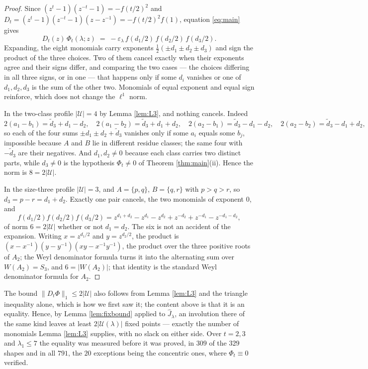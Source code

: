 \documentclass[11pt,reqno]{amsart}
\newcommand{\stverif}{\textcolor{hverif}{\small verified}}
\theoremstyle{plain}
\theoremstyle{definition}
\begin{document}
\begin{proof}
Since $(z^t-1)(z^{-t}-1)=-f(t/2)^2$ and $D_t=(z^t-1)(z^{-t}-1)(z-z^{-1})=-f(t/2)^2f(1)$, equation
\eqref{eq:main} gives
\[
D_t(z)\,\Phi_t(\lambda;z)\;=\;-\varepsilon_\lambda\,f(d_1/2)\,f(d_2/2)\,f(d_3/2).
\]
Expanding, the eight monomials carry exponents $\tfrac12(\pm d_1\pm d_2\pm d_3)$ and sign the
product of the three choices. Two of them cancel exactly when their exponents agree and their signs
differ, and comparing the two cases --- the choices differing in all three signs, or in one --- that
happens only if some $d_i$ vanishes or one of $d_1,d_2,d_3$ is the sum of the other two. Monomials of
equal exponent and equal sign reinforce, which does not change the $\ell^1$ norm.

In the two-class profile $|\mathcal U|=4$ by Lemma \ref{lem:L3}, and nothing cancels. Indeed
\[
2(a_1-b_1)=\tilde d_3+d_1-d_2,\quad
2(a_1-b_2)=\tilde d_3+d_1+d_2,\quad
2(a_2-b_1)=\tilde d_3-d_1-d_2,\quad
2(a_2-b_2)=\tilde d_3-d_1+d_2,
\]
so each of the four sums $\pm d_1\pm d_2+\tilde d_3$ vanishes only if some $a_i$ equals some $b_j$,
impossible because $A$ and $B$ lie in different residue classes; the same four with $-\tilde d_3$ are
their negatives. And $d_1,d_2\ne0$ because each class carries two distinct parts, while $d_3\ne0$ is
the hypothesis $\Phi_t\ne0$ of Theorem \ref{thm:main}(ii). Hence the norm is $8=2|\mathcal U|$.

In the size-three profile $|\mathcal U|=3$, and $A=\{p,q\}$, $B=\{q,r\}$ with $p>q>r$, so
$d_3=p-r=d_1+d_2$. Exactly one pair cancels, the two monomials of exponent $0$, and
\[
f(d_1/2)f(d_2/2)f(d_3/2)=z^{d_1+d_2}-z^{d_1}-z^{d_2}+z^{-d_2}+z^{-d_1}-z^{-d_1-d_2},
\]
of norm $6=2|\mathcal U|$ whether or not $d_1=d_2$. The six is not an accident of the expansion.
Writing $x=z^{d_1/2}$ and $y=z^{d_2/2}$, the product is $(x-x^{-1})(y-y^{-1})(xy-x^{-1}y^{-1})$, the
product over the three positive roots of $A_2$; the Weyl denominator formula turns it into the
alternating sum over $W(A_2)=S_3$, and $6=|W(A_2)|$; that identity is the standard Weyl
denominator formula for $A_2$.
\end{proof}

The bound $\|D_t\Phi\|_1\le2|\mathcal U|$ also follows from Lemma \ref{lem:L3} and the triangle
inequality alone, which is how we first saw it; the content above is that it is an equality. Hence,
by Lemma \ref{lem:fixbound} applied to $\widehat J_\lambda$, an involution there of the same kind
leaves at least $2|\mathcal U(\lambda)|$ fixed points --- exactly the number of monomials Lemma
\ref{lem:L3} supplies, with no slack on either side. Over $t=2,3$ and $\lambda_1\le7$ the equality
was measured before it was proved, in $309$ of the $329$ shapes and in all $791$, the $20$ exceptions
being the concentric ones, where $\Phi_t\equiv0$ \stverif.
\end{document}
